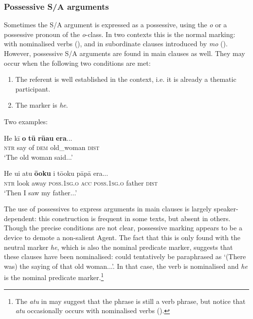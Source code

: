 \subsubsection[Possessive S/A arguments]{Possessive S/A arguments}\label{sec:8.6.4.1}
Sometimes the S/A argument is expressed as a possessive, using the  \textit{o} or a possessive pronoun of the \textit{o}{}-class. In two contexts this is the normal marking: with nominalised verbs (), and in subordinate clauses introduced by \textit{mo} (). However, possessive S/A arguments are found in main clauses as well. They may occur when the following two conditions are met:

\begin{enumerate}
\item 
The referent is well established in the context, i.e. it is already a thematic participant.

\item 
The  marker is \textit{he}.

\end{enumerate}

Two examples:

\ea\label{ex:8.110}
\gll He kī \textbf{o} \textbf{tū} \textbf{rū{\ꞌ}au} \textbf{era}...\\
\textsc{ntr} say of \textsc{dem} old\_woman \textsc{dist}\\

\glt 
‘The old woman said...’ \textstyleExampleref{[R313.171]} 
\z

\ea\label{ex:8.111}
\gll He u{\ꞌ}i atu \textbf{ō{\ꞌ}oku} i tō{\ꞌ}oku pāpā era...\\
\textsc{ntr} look away \textsc{poss.1sg.o} \textsc{acc} \textsc{poss.1sg.o} father \textsc{dist}\\

\glt
‘Then I saw my father...’ \textstyleExampleref{[R101.012]} 
\z

The use of possessives to express arguments in main clauses is largely speaker-depen\-dent: this construction is frequent in some texts, but absent in others. Though the precise conditions are not clear, possessive marking appears to be a device to demote a non-salient Agent. The fact that this is only found with the neutral marker \textit{he}, which is also the nominal predicate marker, suggests that these clauses have been nominalised:  could tentatively be paraphrased as ‘(There was) the saying of that old woman...’. In that case, the verb is nominalised and \textit{he} is the nominal predicate marker.\footnote{\label{fn:432}The  \textit{atu} in  may suggest that the phrase is still a verb phrase, but notice that \textit{atu} occasionally occurs with nominalised verbs ().} 

